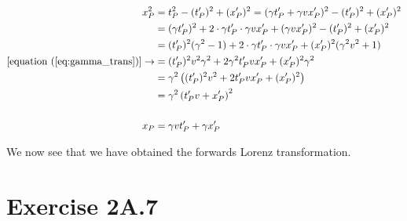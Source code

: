 \documentclass[a4paper,10pt,english]{article}
\begin{document}
\begin{enumerate}
\begin{align*}
x_{P}^{2}&=t_{P}^{2}-(t^{\prime}_{P})^{2}+(x^{\prime}_{P})^{2}=(\gamma t_{P}^{\prime}+\gamma vx_{P}^{\prime})^{2}-(t^{\prime}_{P})^{2}+(x^{\prime}_{P})^{2}\\
&=(\gamma t_{P}^{\prime})^{2}+2\cdot\gamma t_{P}^{\prime}\cdot\gamma vx_{P}^{\prime}+(\gamma vx_{P}^{\prime})^{2}-(t^{\prime}_{P})^{2}+(x^{\prime}_{P})^{2}\\
&=(t^{\prime}_{P})^{2}(\gamma^{2}-1)+2\cdot\gamma t_{P}^{\prime}\cdot\gamma vx_{P}^{\prime}+(x^{\prime}_{P})^{2}(\gamma^{2}v^{2}+1)\\
[\text{equation }(\ref{eq:gamma_trans})]\rightarrow&=(t^{\prime}_{P})^{2}v^{2}\gamma^{2}+2\gamma^{2}t_{P}^{\prime}vx_{P}^{\prime}+(x^{\prime}_{P})^{2}\gamma^{2}\\
&=\gamma^{2}\left((t^{\prime}_{P})^{2}v^{2}+2t_{P}^{\prime}vx_{P}^{\prime}+(x^{\prime}_{P})^{2}\right)\\
&=\gamma^{2}\left(t^{\prime}_{P}v+x^{\prime}_{P}\right)^{2}\\
\\
x_{P}&=\gamma vt^{\prime}_{P}+\gamma x^{\prime}_{P}
\end{align*}

We now see that we have obtained the forwards Lorenz transformation.
\end{enumerate}
%
%
%
%
%
%
%
%
\section*{Exercise 2A.7}
\end{document}
